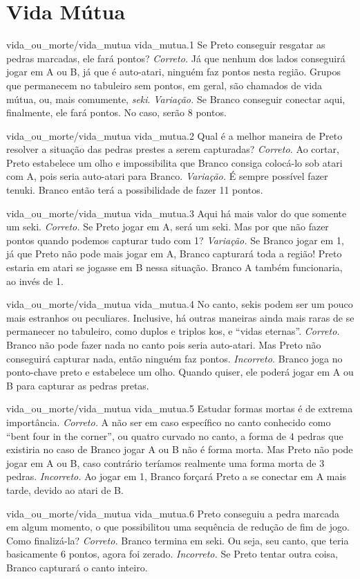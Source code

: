 \chapter{Vida Mútua}

\emptypage

\problemAnswerDiagram
  {vida_ou_morte/vida_mutua}
  {vida_mutua.1}
  {Se Preto conseguir resgatar as pedras marcadas, ele fará pontos?}
  {\emph{Correto.} Já que nenhum dos lados conseguirá jogar em A ou B, já que é auto-atari, ninguém faz pontos nesta região. Grupos que permanecem no tabuleiro sem pontos, em geral, são chamados de vida mútua, ou, mais comumente, \emph{seki}.}
  {\emph{Variação.} Se Branco conseguir conectar aqui, finalmente, ele fará pontos. No caso, serão 8 pontos.}

\problemAnswerDiagram
  {vida_ou_morte/vida_mutua}
  {vida_mutua.2}
  {Qual é a melhor maneira de Preto resolver a situação das pedras prestes a serem capturadas?}
  {\emph{Correto.} Ao cortar, Preto estabelece um olho e impossibilita que Branco consiga colocá-lo sob atari com A, pois seria auto-atari para Branco.}
  {\emph{Variação.} É sempre possível fazer tenuki. Branco então terá a possibilidade de fazer 11 pontos.}

\problemAnswerDiagram
  {vida_ou_morte/vida_mutua}
  {vida_mutua.3}
  {Aqui há mais valor do que somente um seki.}
  {\emph{Correto.} Se Preto jogar em A, será um seki. Mas por que não fazer pontos quando podemos capturar tudo com 1?}
  {\emph{Variação.} Se Branco jogar em 1, já que Preto não pode mais jogar em A, Branco capturará toda a região! Preto estaria em atari se jogasse em B nessa situação. Branco A também funcionaria, ao invés de 1.}

\problemAnswerDiagram
  {vida_ou_morte/vida_mutua}
  {vida_mutua.4}
  {No canto, sekis podem ser um pouco mais estranhos ou peculiares. Inclusive, há outras maneiras ainda mais raras de se permanecer no tabuleiro, como duplos e triplos kos, e ``vidas eternas''.}
  {\emph{Correto.} Branco não pode fazer nada no canto pois seria auto-atari. Mas Preto não conseguirá capturar nada, então ninguém faz pontos.}
  {\emph{Incorreto.} Branco joga no ponto-chave preto e estabelece um olho. Quando quiser, ele poderá jogar em A ou B para capturar as pedras pretas.}

\problemAnswerDiagram
  {vida_ou_morte/vida_mutua}
  {vida_mutua.5}
  {Estudar formas mortas é de extrema importância.}
  {\emph{Correto.} A não ser em caso específico no canto conhecido como ``bent four in the corner'', ou quatro curvado no canto, a forma de 4 pedras que existiria no caso de Branco jogar A ou B não é forma morta. Mas Preto não pode jogar em A ou B, caso contrário teríamos realmente uma forma morta de 3 pedras.}
  {\emph{Incorreto.} Ao jogar em 1, Branco forçará Preto a se conectar em A mais tarde, devido ao atari de B.}

\problemAnswerDiagram
  {vida_ou_morte/vida_mutua}
  {vida_mutua.6}
  {Preto conseguiu a pedra marcada em algum momento, o que possibilitou uma sequência de redução de fim de jogo. Como finalizá-la?}
  {\emph{Correto.} Branco termina em seki. Ou seja, seu canto, que teria basicamente 6 pontos, agora foi zerado.}
  {\emph{Incorreto.} Se Preto tentar outra coisa, Branco capturará o canto inteiro.}